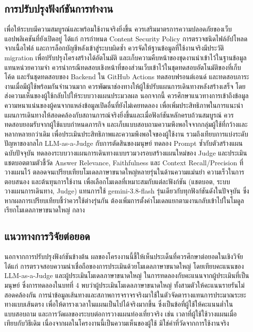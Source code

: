 \subsection{การปรับปรุงฟังก์ชันการทำงาน}

เพื่อให้ระบบมีความสมบูรณ์และพร้อมใช้งานจริงยิ่งขึ้น ควรเสริมมาตรการความปลอดภัยของเว็บแอปพลิเคชันที่ยังเปิดอยู่ ได้แก่ การกำหนด Content Security Policy การตรวจชนิดไฟล์อัปโหลดจากเนื้อไฟล์ และการล็อกบัญชีหลังเข้าสู่ระบบผิดซ้ำ ควรจัดให้ฐานข้อมูลที่ใช้งานจริงมีประวัติ migration เพื่อปรับปรุงโครงสร้างได้อัตโนมัติ และเก็บความคืบหน้าของชุดงานนำเข้าไว้ในฐานข้อมูลแทนหน่วยความจำ ควรนำกรณีทดสอบเชิงหน้าที่ของส่วนเว็บเข้าไว้ในชุดทดสอบอัตโนมัติของที่เก็บโค้ด และรันชุดทดสอบของ Backend ใน GitHub Actions ทดสอบฟรอนต์เอนด์ และทดสอบภาระงานเมื่อมีผู้ใช้พร้อมกันจำนวนมาก ควรพัฒนาช่องทางให้ผู้ใช้ปรับแผนการเดินทางหลังสร้างเสร็จ โดยส่งความเห็นของผู้ใช้กลับไปให้ระบบวางแผนประมวลผล นอกจากนี้ ควรศึกษาแนวทางการเข้าถึงข้อมูลความหนาแน่นของผู้คนจากแหล่งข้อมูลเปิดอื่นที่ยังไม่เคยทดลอง เพื่อเพิ่มประสิทธิภาพในการแนะนำแผนการเดินทางให้สอดคล้องกับสถานการณ์จริงยิ่งขึ้นและเมื่อฟังก์ชันหลักครบถ้วนสมบูรณ์ ควรทดสอบยอมรับจากผู้ใช้แบบกำหนดภารกิจ และเก็บแบบสอบถามความพึงพอใจจากกลุ่มผู้ใช้ที่กว้างและหลากหลายกว่าเดิม เพื่อประเมินประสิทธิภาพและความพึงพอใจของผู้ใช้งาน รวมถึงเทียบการแบ่งระดับปัญหาของกลไก LLM-as-a-Judge กับการตัดสินของมนุษย์ ทดลอง Prompt ซ้ำกับตัวสร้างแผนฉบับปัจจุบัน ทดลองระบบวางแผนการเดินทางแบบรวมวงรอบสร้างแผนใหม่ของ Judge และประเมินแชตบอตตามตัวชี้วัด Answer Relevance, Faithfulness และ Context Recall/Precision ที่วางแผนไว้ ตลอดจนเปรียบเทียบโมเดลภาษาขนาดใหญ่หลายรุ่นในด้านความแม่นยำ ความเร็วในการตอบสนอง และต้นทุนการใช้งาน เพื่อเลือกโมเดลที่เหมาะสมกับแต่ละฟังก์ชัน (แชตบอต, ระบบวางแผนการเดินทาง, Judge) แทนการใช้ gemini-3.8-flash รุ่นเดียวกับทุกฟังก์ชันดังในปัจจุบัน ซึ่งหากผลการเปรียบเทียบชี้ว่าควรใช้ต่างรุ่นกัน ต้องเพิ่มการตั้งค่าโมเดลแยกตามงานกลับเข้าไปในโมดูลเรียกโมเดลภาษาขนาดใหญ่ กลาง

\subsection{แนวทางการวิจัยต่อยอด}

นอกจากการปรับปรุงฟังก์ชันข้างต้น ผลของโครงงานนี้ชี้ให้เห็นประเด็นที่ควรศึกษาต่อยอดในเชิงวิจัย ได้แก่ การตรวจสอบความน่าเชื่อถือของการประเมินด้วยโมเดลภาษาขนาดใหญ่ โดยเทียบคะแนนของ LLM-as-a-Judge และผู้ประเมินโมเดลภาษาขนาดใหญ่ ในการทดลองกับคะแนนจากผู้ประเมินที่เป็นมนุษย์ ซึ่งการทดลองในบทที่ 4 พบว่าผู้ประเมินโมเดลภาษาขนาดใหญ่ ทั้งสามตัวให้คะแนนรายรันไม่สอดคล้องกัน การนำข้อมูลเส้นทางและสภาพการจราจรจริงมาใช้ในตัวจัดตารางแทนการประมาณระยะทางแบบเส้นตรง เพื่อให้ตารางเวลาในแผนเป็นไปได้จริงมากขึ้น ซึ่งเป็นข้อที่ผู้ใช้ให้คะแนนต่ำในแบบสอบถาม และการวัดผลของระบบต่อการวางแผนท่องเที่ยวจริง เช่น เวลาที่ผู้ใช้ใช้วางแผนเมื่อเทียบกับวิธีเดิม เนื่องจากผลในโครงงานนี้เป็นความเห็นของผู้ใช้ มิใช่ค่าที่วัดจากการใช้งานจริง
